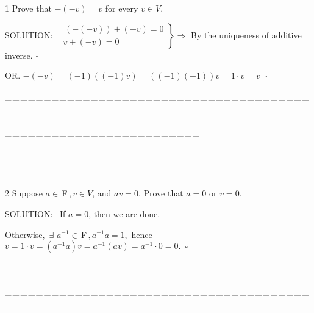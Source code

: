 \documentclass[a4paper, 11pt, UTF8]{article}
\def\Fbf{$\,{\timesbf F}\,$}
\begin{document}
\begin{large}
{\timesbf\Large 1} {\timessl\Large 
Prove that $−(−v) = v$ for every $v\in V$.
}\par
{\timesbf S\footnotesize{OLUTION:}}\,\,\,
$\left.\begin{array}{l}\,(-(-v))+(-v)=0\\ v+(-v)=0\end{array}\right\}\Rightarrow$ By the uniqueness of additive inverse. $\square$\par\quad
O{\small R}. $-(-v)=(-1)((-1)v)=((-1)(-1))v=1\cdot v=v\,\,\,\square$
\par
{\tiny \_\,\_\,\_\,\_\,\_\,\_\,\_\,\_\,\_\,\_\,\_\,\_\,\_\,\_\,\_\,\_\,\_\,\_\,\_\,\_\,\_\,\_\,\_\,\_\,\_\,\_\,\_\,\_\,\_\,\_\,\_\,\_\,\_\,\_\,\_\,\_\,\_\,\_\,\_\,\_\,\_\,\_\,\_\,\_\,\_\,\_\,\_\,\_\,\_\,\_\,\_\,\_\,\_\,\_\,\_\,\_\,\_\,\_\,\_\,\_\,\_\,\_\,\_\,\_\,\_\,\_\,\_\,\_\,\_\,\_\,\_\_\,\_\,\_\,\_\,\_\,\_\,\_\,\_\,\_\,\_\,\_\,\_\,\_\,\_\,\_\,\_\,\_\,\_\,\_\,\_\,\_\,\_\,\_\,\_\,\_\,\_\,\_\,\_\,\_\,\_\,\_\,\_\,\_\,\_\,\_\,\_\,\_\,\_\,\_\,\_\,\_\,\_\,\_\,\_\,\_\,\_\,\_\,\_\,\_\,\_\,\_\,\_\,\_\,\_\,\_\,\_\,\_\,\_\,\_\,\_\,\_\,\_\,\_\,\_\,\_\,\_\,\_\,\_\,\_\,\_\,\_}{\tiny\,\par}{\,}\par

{\timesbf\Large 2} {\timessl\Large 
Suppose $a\in\Fbf,v\in V$, and $av = 0$. Prove that $a = 0$ or $v = 0$.
}\par
{\timesbf S\footnotesize{OLUTION:}}\,\,\,
If $a=0$, then we are done.\par\qquad\qquad\quad
Otherwise, $\,\exists\,\,a^{-1}\in\Fbf,a^{-1}a=1,$ hence $v=1\cdot v=(a^{-1}a)v=a^{-1}(av)=a^{-1}\cdot 0=0.\,\,\,\square$\par
{\tiny \_\,\_\,\_\,\_\,\_\,\_\,\_\,\_\,\_\,\_\,\_\,\_\,\_\,\_\,\_\,\_\,\_\,\_\,\_\,\_\,\_\,\_\,\_\,\_\,\_\,\_\,\_\,\_\,\_\,\_\,\_\,\_\,\_\,\_\,\_\,\_\,\_\,\_\,\_\,\_\,\_\,\_\,\_\,\_\,\_\,\_\,\_\,\_\,\_\,\_\,\_\,\_\,\_\,\_\,\_\,\_\,\_\,\_\,\_\,\_\,\_\,\_\,\_\,\_\,\_\,\_\,\_\,\_\,\_\,\_\,\_\_\,\_\,\_\,\_\,\_\,\_\,\_\,\_\,\_\,\_\,\_\,\_\,\_\,\_\,\_\,\_\,\_\,\_\,\_\,\_\,\_\,\_\,\_\,\_\,\_\,\_\,\_\,\_\,\_\,\_\,\_\,\_\,\_\,\_\,\_\,\_\,\_\,\_\,\_\,\_\,\_\,\_\,\_\,\_\,\_\,\_\,\_\,\_\,\_\,\_\,\_\,\_\,\_\,\_\,\_\,\_\,\_\,\_\,\_\,\_\,\_\,\_\,\_\,\_\,\_\,\_\,\_\,\_\,\_\,\_\,\_}{\tiny\,\par}


\end{large}
\end{document}
